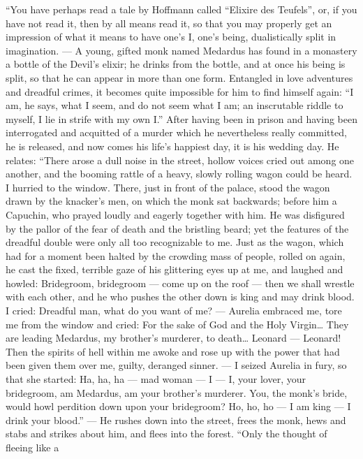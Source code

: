 \documentclass[12pt,a4paper,openany]{book}
\newcommand{\opage}[1]{\marginnote{\footnotesize\textit{[#1]}}}
\begin{document}
``You have perhaps read a tale by Hoffmann
called ``Elixire des Teufels'', or, if you have not
read it, then by all means read it, so that you may properly
get an impression of what it means to have one's I, one's
being, dualistically split in imagination. --- A young, gifted
monk named Medardus has found in a monastery a
bottle of the Devil's elixir; he drinks from the bottle, and
at once his being is split, so that he can appear
in more than one form. Entangled in love adventures
and dreadful crimes, it becomes quite
impossible for him to find himself again: ``I am, he says,
what I seem, and do not seem what I am;
an inscrutable riddle to myself, I lie in strife
with my own I.'' After having been in prison and having
been interrogated and acquitted of a murder which he nevertheless
really committed, he is released, and now comes his
life's happiest day, it is his wedding day. He
relates: ``There arose a dull noise in the street, hollow
voices cried out among one another, and the booming
\setcounter{footnote}{0}%
\opage{102}rattle of a heavy, slowly rolling wagon could be
heard. I hurried to the window. There, just in front of
the palace, stood the wagon drawn by the knacker's men, on
which the monk sat backwards; before him a Capuchin,
who prayed loudly and eagerly together with him. He was
disfigured by the pallor of the fear of death and the bristling
beard; yet the features of the dreadful double were
only all too recognizable to me. Just as the wagon, which had for a
moment been halted by the crowding
mass of people, rolled on again, he cast the fixed,
terrible gaze of his glittering eyes up at me, and
laughed and howled: Bridegroom, bridegroom --- come up on
the roof --- then we shall wrestle with each other, and he
who pushes the other down is king and may drink
blood. I cried: Dreadful man, what do you want
of me? --- Aurelia embraced me, tore me from the window
and cried: For the sake of God and the Holy Virgin\dots{}
They are leading Medardus, my brother's murderer, to death\dots{}
Leonard --- Leonard! Then the spirits of hell within
me awoke and rose up with the power that
had been given them over me, guilty, deranged sinner.
--- I seized Aurelia in fury, so that she started:
Ha, ha, ha --- mad woman --- I --- I, your
lover, your bridegroom, am Medardus, am your brother's
murderer. You, the monk's bride, would howl perdition down
upon your bridegroom? Ho, ho, ho --- I am king ---
I drink your blood.'' --- He rushes down into the street, frees
the monk, hews and stabs and strikes about him, and
flees into the forest. ``Only the thought of fleeing like a
\end{document}
